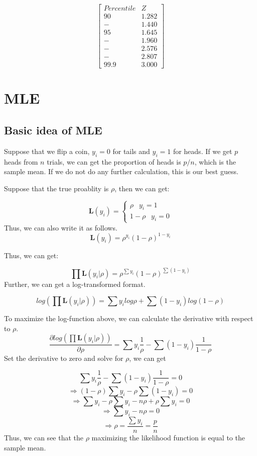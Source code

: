 \documentclass[]{book}
\begin{document}
\[\begin{bmatrix}
Percentile & Z \\
90  & 1.282 \\
- & 1.440 \\
95 & 1.645 \\
- & 1.960 \\
- & 2.576 \\
- & 2.807 \\
99.9 & 3.000 \end{bmatrix}\]

\hypertarget{intro}{%
\chapter{MLE}\label{intro}}

\hypertarget{basic-idea-of-mle}{%
\section{Basic idea of MLE}\label{basic-idea-of-mle}}

Suppose that we flip a coin, \(y_i=0\) for tails and \(y_i=1\) for heads. If we get \(p\) heads from \(n\) trials, we can get the proportion of heads is \(p/n\), which is the sample mean. If we do not do any further calculation, this is our best guess.

Suppose that the true proablity is \(\rho\), then we can get:

\[
\mathbf{L}(y_i)=\begin{cases} \rho \;\;\:   y_i = 1 \\ 1-\rho \;\;\:  y_i = 0 \end{cases}
\]
Thus, we can also write it as follows.
\[\mathbf{L}(y_i) = \rho^{y_i}(1-\rho)^{1-y_i}\]

Thus, we can get:

\[\prod \mathbf{L}(y_i|\rho)=\rho^{\sum y_i}(1-\rho)^{\sum(1-y_i)}\]
Further, we can get a log-transformed format.

\[log (\prod \mathbf{L}(y_i|\rho))=\sum y_i log \rho + \sum(1-y_i) log(1-\rho)\]

To maximize the log-function above, we can calculate the derivative with respect to \(\rho\).
\[\frac{\partial log (\prod \mathbf{L}(y_i|\rho)) }{\partial \rho}=\sum y_i \frac{1}{\rho}-\sum(1-y_i) \frac{1}{1-\rho}\]
Set the derivative to zero and solve for \(\rho\), we can get

\[\sum y_i \frac{1}{\rho}-\sum(1-y_i) \frac{1}{1-\rho}=0\]
\[\Rightarrow (1-\rho)\sum y_i - \rho \sum(1-y_i) =0\]
\[\Rightarrow \sum y_i-\rho\sum y_i - n\rho +\rho\sum y_i =0\]
\[\Rightarrow \sum y_i - n\rho  =0\]
\[\Rightarrow \rho  = \frac{\sum y_i}{n}=\frac{p}{n}\]
Thus, we can see that the \(\rho\) maximizing the likelihood function is equal to the sample mean.
\end{document}
